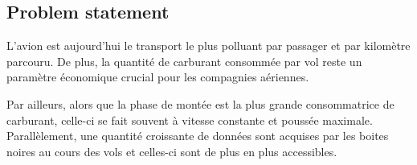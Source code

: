 \documentclass[a0,portrait]{a0poster}
\begin{document}
\begin{multicols}{2} %



%
%


\color{DarkSlateGray}

\section{Problem statement}
\color{Navy} %
L'avion est aujourd'hui le transport le plus polluant par passager et par kilomètre parcouru. De plus, la quantité de carburant consommée par vol reste un paramètre économique crucial pour les compagnies aériennes. 

Par ailleurs, alors que la phase de montée est la plus grande consommatrice de carburant, celle-ci se fait souvent à vitesse constante et poussée maximale. Parallèlement, une quantité croissante de données sont acquises par les boites noires au cours des vols et celles-ci sont de plus en plus accessibles.
\newline


\end{multicols}
\end{document}
